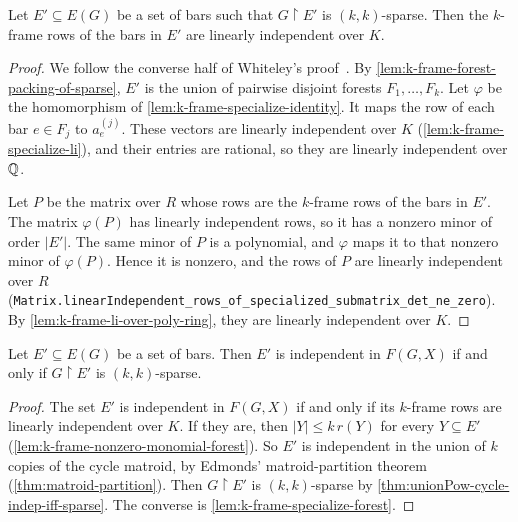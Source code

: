 \begin{lemma}
  \label{lem:k-frame-specialize-forest}
  \leanok
  Let $E' \subseteq E(G)$ be a set of bars such that $G \restriction E'$
  is $(k, k)$-sparse. Then the $k$-frame rows of the bars in $E'$ are
  linearly independent over $K$.
\end{lemma}
\begin{proof}
  \leanok
  We follow the converse half of Whiteley's
  proof~\cite[Theorem~1]{whiteley1988}. By
  \cref{lem:k-frame-forest-packing-of-sparse}, $E'$ is the union of
  pairwise disjoint forests $F_1, \dots, F_k$. Let $\varphi$ be the
  homomorphism of \cref{lem:k-frame-specialize-identity}. It maps the
  row of each bar $e \in F_j$ to $a_e^{(j)}$. These vectors are
  linearly independent over $K$ (\cref{lem:k-frame-specialize-li}), and
  their entries are rational, so they are linearly independent over
  ${\mathbb{Q}}$.

  Let $P$ be the matrix over $R$ whose rows are the $k$-frame rows of
  the bars in $E'$. The matrix $\varphi(P)$ has linearly independent
  rows, so it has a nonzero minor of order $|E'|$. The same minor of $P$
  is a polynomial, and $\varphi$ maps it to that nonzero minor of
  $\varphi(P)$. Hence it is nonzero, and the rows of $P$ are linearly
  independent over $R$
  (\texttt{Matrix.\allowbreak{}linearIndependent\_\allowbreak{}rows\_\allowbreak{}of\_\allowbreak{}specialized\_\allowbreak{}submatrix\_\allowbreak{}det\_\allowbreak{}ne\_\allowbreak{}zero}).
  By \cref{lem:k-frame-li-over-poly-ring}, they are linearly independent
  over $K$.
\end{proof}

\begin{lemma}
  \label{lem:k-frame-indep-iff-count}
  \leanok
  Let $E' \subseteq E(G)$ be a set of bars. Then $E'$ is independent in
  $F(G, X)$ if and only if $G \restriction E'$ is $(k, k)$-sparse.
\end{lemma}
\begin{proof}
  \leanok
  The set $E'$ is independent in $F(G, X)$ if and only if its $k$-frame
  rows are linearly independent over $K$. If they are, then
  $|Y| \le k\, r(Y)$ for every $Y \subseteq E'$
  (\cref{lem:k-frame-nonzero-monomial-forest}). So $E'$ is independent
  in the union of $k$ copies of the cycle matroid, by Edmonds'
  matroid-partition theorem (\cref{thm:matroid-partition}). Then
  $G \restriction E'$ is $(k, k)$-sparse by
  \cref{thm:unionPow-cycle-indep-iff-sparse}. The
  converse is \cref{lem:k-frame-specialize-forest}.
\end{proof}

